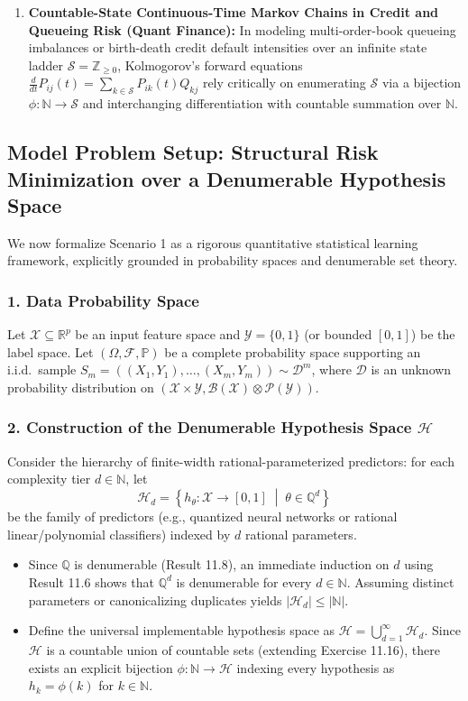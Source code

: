 \documentclass[11pt, letterpaper]{article}
\theoremstyle{definition}
\theoremstyle{remark}
\begin{document}
\begin{enumerate}[label=\textbf{\arabic*.}]
    \item \textbf{Countable-State Continuous-Time Markov Chains in Credit and Queueing Risk (Quant Finance):}
    In modeling multi-order-book queueing imbalances or birth-death credit default intensities over an infinite state ladder $\mathcal{S} = \mathbb{Z}_{\geq 0}$, Kolmogorov's forward equations $\frac{d}{dt} P_{ij}(t) = \sum_{k \in \mathcal{S}} P_{ik}(t) Q_{kj}$ rely critically on enumerating $\mathcal{S}$ via a bijection $\phi : \mathbb{N} \to \mathcal{S}$ and interchanging differentiation with countable summation over $\mathbb{N}$.
\end{enumerate}

\subsection{Model Problem Setup: Structural Risk Minimization over a Denumerable Hypothesis Space}

We now formalize Scenario 1 as a rigorous quantitative statistical learning framework, explicitly grounded in probability spaces and denumerable set theory.

\subsubsection*{1. Data Probability Space}
Let $\mathcal{X} \subseteq \mathbb{R}^p$ be an input feature space and $\mathcal{Y} = \{0, 1\}$ (or bounded $[0, 1]$) be the label space. Let $(\Omega, \mathcal{F}, \mathbb{P})$ be a complete probability space supporting an i.i.d.\ sample $S_m = ((X_1, Y_1), \dots, (X_m, Y_m)) \sim \mathcal{D}^m$, where $\mathcal{D}$ is an unknown probability distribution on $(\mathcal{X} \times \mathcal{Y}, \mathcal{B}(\mathcal{X}) \otimes \mathcal{P}(\mathcal{Y}))$.

\subsubsection*{2. Construction of the Denumerable Hypothesis Space $\mathcal{H}$}
Consider the hierarchy of finite-width rational-parameterized predictors: for each complexity tier $d \in \mathbb{N}$, let
\[
\mathcal{H}_d = \left\{ h_\theta : \mathcal{X} \to [0, 1] \;\middle|\; \theta \in \mathbb{Q}^d \right\}
\]
be the family of predictors (e.g., quantized neural networks or rational linear/polynomial classifiers) indexed by $d$ rational parameters.
\begin{itemize}
    \item Since $\mathbb{Q}$ is denumerable (Result 11.8), an immediate induction on $d$ using Result 11.6 shows that $\mathbb{Q}^d$ is denumerable for every $d \in \mathbb{N}$. Assuming distinct parameters or canonicalizing duplicates yields $|\mathcal{H}_d| \leq |\mathbb{N}|$.
    \item Define the universal implementable hypothesis space as $\mathcal{H} = \bigcup_{d=1}^\infty \mathcal{H}_d$. Since $\mathcal{H}$ is a countable union of countable sets (extending Exercise 11.16), there exists an explicit bijection $\phi : \mathbb{N} \to \mathcal{H}$ indexing every hypothesis as $h_k = \phi(k)$ for $k \in \mathbb{N}$.
\end{itemize}
\end{document}
